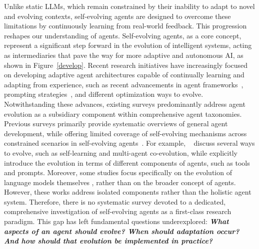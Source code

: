 \documentclass[10pt]{article} %
\begin{document}
Unlike static LLMs, which remain constrained by their inability to adapt to novel and evolving contexts, self-evolving agents are designed to overcome these limitations by continuously learning from real-world feedback.
This progression reshapes our understanding of agents. 
Self-evolving agents, as a core concept, represent a significant step forward in the evolution of intelligent systems, acting as intermediaries that pave the way for more adaptive and autonomous AI, as shown in Figure~\ref{develop}.
Recent research initiatives have increasingly focused on developing adaptive agent architectures capable of continually learning and adapting from experience, such as recent advancements in agent frameworks~\citep{yin2025godelagentselfreferentialagent}, prompting strategies~\citep{fernando2023promptbreeder}, and different optimization ways to evolve. Notwithstanding these advances, existing surveys predominantly address agent evolution as a subsidiary component within comprehensive agent taxonomies. Previous surveys primarily provide systematic overviews of general agent development, while offering limited coverage of self-evolving mechanisms across constrained scenarios in self-evolving agents~\citep {luo2025largelanguagemodelagent, liu2025advanceschallengesfoundationagents}. For example, ~\cite{luo2025largelanguagemodelagent} discuss several ways to evolve, such as self-learning and multi-agent co-evolution, while \cite{liu2025advanceschallengesfoundationagents} explicitly introduce the evolution in terms of different components of agents, such as tools and prompts. Moreover, some studies focus specifically on the evolution of language models themselves \citep{tao2024survey-self-evo-llm}, rather than on the broader concept of agents. However, these works address isolated components rather than the holistic agent system. Therefore, there is no systematic survey devoted
to a dedicated, comprehensive investigation of self-evolving agents as a first-class research paradigm. This
gap has left fundamental questions underexplored: \textbf{\textit{What aspects of an agent should evolve? When should adaptation occur? And how should that evolution be implemented in practice?}}
\end{document}
